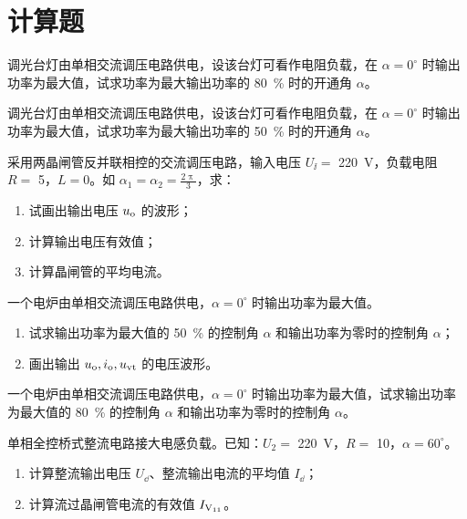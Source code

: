 \documentclass[电力电子]{subfiles}
\begin{document}
\section{计算题}
\begin{ti}[10 分]
	调光台灯由单相交流调压电路供电，设该台灯可看作电阻负载，在 $\alpha = 0^\circ$ 时输出功率为最大值，试求功率为最大输出功率的 \SI{80}{\percent} 时的开通角 $\alpha$。
\end{ti}

\begin{ti}[10 分]
	调光台灯由单相交流调压电路供电，设该台灯可看作电阻负载，在 $\alpha = 0^\circ$ 时输出功率为最大值，试求功率为最大输出功率的 \SI{50}{\percent} 时的开通角 $\alpha$。
\end{ti}

\begin{ti}[15 分]
	采用两晶闸管反并联相控的交流调压电路，输入电压 $U_{\ii} = $ \SI{220}{V}，负载电阻 $R = $ \SI{5}{\Omega}，$L = 0$。如 $\alpha_{1} = \alpha_{2} = \frac{2\uppi}{3}$，求：
	\begin{enumerate}
		\item 试画出输出电压 $u_{\mathrm{o}}$ 的波形；
		\item 计算输出电压有效值；
		\item 计算晶闸管的平均电流。
	\end{enumerate}
\end{ti}

\begin{ti}[16 分]
	一个电炉由单相交流调压电路供电，$\alpha = 0^\circ$ 时输出功率为最大值。
	\begin{enumerate}
		\item 试求输出功率为最大值的 \SI{50}{\percent} 的控制角 $\alpha$ 和输出功率为零时的控制角 $\alpha$；
		\item 画出输出 $u_{\mathrm{o}},i_{\mathrm{o}},u_{\mathrm{vt}}$ 的电压波形。
	\end{enumerate}
\end{ti}

\begin{ti}
	一个电炉由单相交流调压电路供电，$\alpha = 0^\circ$ 时输出功率为最大值，试求输出功率为最大值的 \SI{80}{\percent} 的控制角 $\alpha$ 和输出功率为零时的控制角 $\alpha$。
\end{ti}

\begin{ti}
	单相全控桥式整流电路接大电感负载。已知：$U_{2} = $ \SI{220}{V}，$R = $ \SI{10}{\Omega}，$\alpha = 60^\circ$。
	\begin{enumerate}
		\item 计算整流输出电压 $U_{\dd}$、整流输出电流的平均值 $I_{\dd}$；
		\item 计算流过晶闸管电流的有效值 $I_{\text{V\textsubscript{11}}}$。
	\end{enumerate}
\end{ti}
\end{document}
